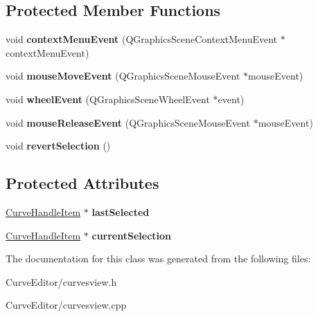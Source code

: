 \subsection*{\-Protected \-Member \-Functions}
\begin{DoxyCompactItemize}
\item 
\hypertarget{class_curves_view_a007a89ebd957a37690d7a5939b5c281c}{
void {\bfseries context\-Menu\-Event} (\-Q\-Graphics\-Scene\-Context\-Menu\-Event $\ast$context\-Menu\-Event)}
\label{class_curves_view_a007a89ebd957a37690d7a5939b5c281c}

\item 
\hypertarget{class_curves_view_a30b356ca049b30f74a8bfdc3611e44d9}{
void {\bfseries mouse\-Move\-Event} (\-Q\-Graphics\-Scene\-Mouse\-Event $\ast$mouse\-Event)}
\label{class_curves_view_a30b356ca049b30f74a8bfdc3611e44d9}

\item 
\hypertarget{class_curves_view_a77a9c06fe795cc772152ade4ea024aa2}{
void {\bfseries wheel\-Event} (\-Q\-Graphics\-Scene\-Wheel\-Event $\ast$event)}
\label{class_curves_view_a77a9c06fe795cc772152ade4ea024aa2}

\item 
\hypertarget{class_curves_view_a75c6ea242dceadc149aa61f42bef2794}{
void {\bfseries mouse\-Release\-Event} (\-Q\-Graphics\-Scene\-Mouse\-Event $\ast$mouse\-Event)}
\label{class_curves_view_a75c6ea242dceadc149aa61f42bef2794}

\item 
\hypertarget{class_curves_view_ada2a041554aee5624bee2dabeb4fc3c3}{
void {\bfseries revert\-Selection} ()}
\label{class_curves_view_ada2a041554aee5624bee2dabeb4fc3c3}

\end{DoxyCompactItemize}
\subsection*{\-Protected \-Attributes}
\begin{DoxyCompactItemize}
\item 
\hypertarget{class_curves_view_a4624931a6cab3b1b9325601c1ea4981b}{
\hyperlink{class_curve_handle_item}{\-Curve\-Handle\-Item} $\ast$ {\bfseries last\-Selected}}
\label{class_curves_view_a4624931a6cab3b1b9325601c1ea4981b}

\item 
\hypertarget{class_curves_view_a8ba6fc4eef3c4af71246d73945366b63}{
\hyperlink{class_curve_handle_item}{\-Curve\-Handle\-Item} $\ast$ {\bfseries current\-Selection}}
\label{class_curves_view_a8ba6fc4eef3c4af71246d73945366b63}

\end{DoxyCompactItemize}


\-The documentation for this class was generated from the following files\-:\begin{DoxyCompactItemize}
\item 
\-Curve\-Editor/curvesview.\-h\item 
\-Curve\-Editor/curvesview.\-cpp\end{DoxyCompactItemize}
